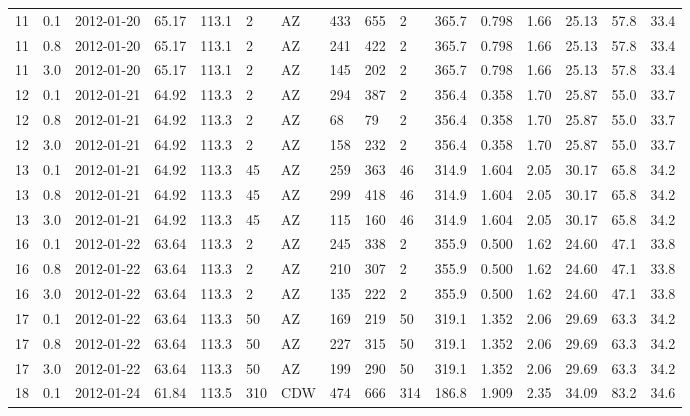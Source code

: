 {\begin{landscape}
\begin{longtable}{llllllllllllllll}
11 & 0.1 & 2012-01-20 & \textminus{}65.17 & 113.1 & 2 & AZ & 433 & 655 & 2 & 365.7 & \textminus{}0.798 & 1.66 & 25.13 & 57.8 & 33.4\\
11 & 0.8 & 2012-01-20 & \textminus{}65.17 & 113.1 & 2 & AZ & 241 & 422 & 2 & 365.7 & \textminus{}0.798 & 1.66 & 25.13 & 57.8 & 33.4\\
11 & 3.0 & 2012-01-20 & \textminus{}65.17 & 113.1 & 2 & AZ & 145 & 202 & 2 & 365.7 & \textminus{}0.798 & 1.66 & 25.13 & 57.8 & 33.4\\
12 & 0.1 & 2012-01-21 & \textminus{}64.92 & 113.3 & 2 & AZ & 294 & 387 & 2 & 356.4 & \textminus{}0.358 & 1.70 & 25.87 & 55.0 & 33.7\\
12 & 0.8 & 2012-01-21 & \textminus{}64.92 & 113.3 & 2 & AZ & 68 & 79 & 2 & 356.4 & \textminus{}0.358 & 1.70 & 25.87 & 55.0 & 33.7\\
12 & 3.0 & 2012-01-21 & \textminus{}64.92 & 113.3 & 2 & AZ & 158 & 232 & 2 & 356.4 & \textminus{}0.358 & 1.70 & 25.87 & 55.0 & 33.7\\
13 & 0.1 & 2012-01-21 & \textminus{}64.92 & 113.3 & 45 & AZ & 259 & 363 & 46 & 314.9 & \textminus{}1.604 & 2.05 & 30.17 & 65.8 & 34.2\\
13 & 0.8 & 2012-01-21 & \textminus{}64.92 & 113.3 & 45 & AZ & 299 & 418 & 46 & 314.9 & \textminus{}1.604 & 2.05 & 30.17 & 65.8 & 34.2\\
13 & 3.0 & 2012-01-21 & \textminus{}64.92 & 113.3 & 45 & AZ & 115 & 160 & 46 & 314.9 & \textminus{}1.604 & 2.05 & 30.17 & 65.8 & 34.2\\
16 & 0.1 & 2012-01-22 & \textminus{}63.64 & 113.3 & 2 & AZ & 245 & 338 & 2 & 355.9 & 0.500 & 1.62 & 24.60 & 47.1 & 33.8\\
16 & 0.8 & 2012-01-22 & \textminus{}63.64 & 113.3 & 2 & AZ & 210 & 307 & 2 & 355.9 & 0.500 & 1.62 & 24.60 & 47.1 & 33.8\\
16 & 3.0 & 2012-01-22 & \textminus{}63.64 & 113.3 & 2 & AZ & 135 & 222 & 2 & 355.9 & 0.500 & 1.62 & 24.60 & 47.1 & 33.8\\
17 & 0.1 & 2012-01-22 & \textminus{}63.64 & 113.3 & 50 & AZ & 169 & 219 & 50 & 319.1 & \textminus{}1.352 & 2.06 & 29.69 & 63.3 & 34.2\\
17 & 0.8 & 2012-01-22 & \textminus{}63.64 & 113.3 & 50 & AZ & 227 & 315 & 50 & 319.1 & \textminus{}1.352 & 2.06 & 29.69 & 63.3 & 34.2\\
17 & 3.0 & 2012-01-22 & \textminus{}63.64 & 113.3 & 50 & AZ & 199 & 290 & 50 & 319.1 & \textminus{}1.352 & 2.06 & 29.69 & 63.3 & 34.2\\
18 & 0.1 & 2012-01-24 & \textminus{}61.84 & 113.5 & 310 & CDW & 474 & 666 & 314 & 186.8 & 1.909 & 2.35 & 34.09 & 83.2 & 34.6\\

\end{longtable}
\end{landscape}}
